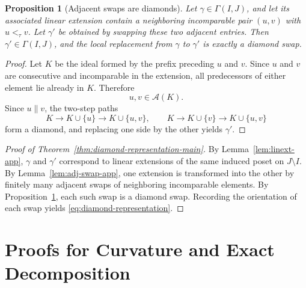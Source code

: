 \documentclass{article}
\newtheorem{proposition}[theorem]{Proposition}
\theoremstyle{definition}
\begin{document}
\begin{proposition}[Adjacent swaps are diamonds]
\label{prop:swap-diamond-app}
Let \(\gamma\in \Gamma(I,J)\), and let its associated linear extension contain a neighboring incomparable pair \((u,v)\) with \(u<_{\tau}v\). Let \(\gamma'\) be obtained by swapping these two adjacent entries. Then \(\gamma'\in \Gamma(I,J)\), and the local replacement from \(\gamma\) to \(\gamma'\) is exactly a diamond swap.
\end{proposition}

\begin{proof}
Let \(K\) be the ideal formed by the prefix preceding \(u\) and \(v\). Since \(u\) and \(v\) are consecutive and incomparable in the extension, all predecessors of either element lie already in \(K\). Therefore
\[
u,v\in \mathcal A(K).
\]
Since \(u\parallel v\), the two-step paths
\[
K\to K\cup\{u\}\to K\cup\{u,v\},
\qquad
K\to K\cup\{v\}\to K\cup\{u,v\}
\]
form a diamond, and replacing one side by the other yields \(\gamma'\).
\end{proof}

\begin{proof}[Proof of Theorem~\ref{thm:diamond-representation-main}]
By Lemma~\ref{lem:linext-app}, \(\gamma\) and \(\gamma'\) correspond to linear extensions of the same induced poset on \(J\setminus I\). By Lemma~\ref{lem:adj-swap-app}, one extension is transformed into the other by finitely many adjacent swaps of neighboring incomparable elements. By Proposition~\ref{prop:swap-diamond-app}, each such swap is a diamond swap. Recording the orientation of each swap yields \eqref{eq:diamond-representation}.
\end{proof}

\section{Proofs for Curvature and Exact Decomposition}
\label{app:struct}
\end{document}
